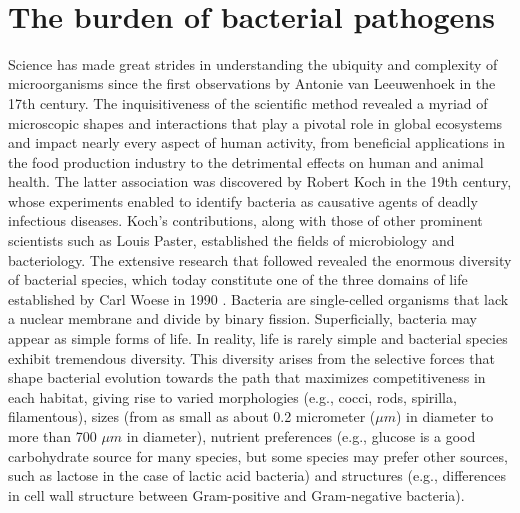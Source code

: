 \renewcommand*{\thefootnote}{\arabic{footnote}}

\mbox{}\\
\vspace{8cm}

\section{The burden of bacterial pathogens}

Science has made great strides in understanding the ubiquity and complexity of microorganisms since the first observations by Antonie van Leeuwenhoek in the 17th century. The inquisitiveness of the scientific method revealed a myriad of microscopic shapes and interactions that play a pivotal role in global ecosystems and impact nearly every aspect of human activity, from beneficial applications in the food production industry to the detrimental effects on human and animal health. The latter association was discovered by Robert Koch in the 19th century, whose experiments enabled to identify bacteria as causative agents of deadly infectious diseases. Koch’s contributions, along with those of other prominent scientists such as Louis Paster, established the fields of microbiology and bacteriology. The extensive research that followed revealed the enormous diversity of bacterial species, which today constitute one of the three domains of life established by Carl Woese in 1990 \cite{woese_towards_1990}.
Bacteria are single-celled organisms that lack a nuclear membrane and divide by binary fission. Superficially, bacteria may appear as simple forms of life. In reality, life is rarely simple and bacterial species exhibit tremendous diversity. This diversity arises from the selective forces that shape bacterial evolution towards the path that maximizes competitiveness in each habitat, giving rise to varied morphologies (e.g., cocci, rods, spirilla, filamentous), sizes (from as small as about 0.2 micrometer ($\mu m$) in diameter to more than 700 $\mu m$ in diameter), nutrient preferences (e.g., glucose is a good carbohydrate source for many species, but some species may prefer other sources, such as lactose in the case of lactic acid bacteria) and structures (e.g., differences in cell wall structure between Gram-positive and Gram-negative bacteria).

